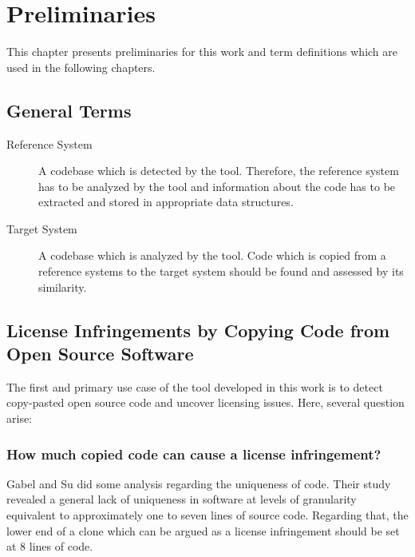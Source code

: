
\chapter{Preliminaries}\label{chapter:preliminaries}
This chapter presents preliminaries for this work and term definitions which are used in the following chapters.

\section{General Terms}
\begin{description}
	\item[Reference System]
		A codebase which is detected by the tool. 
		Therefore, the reference system has to be analyzed by the tool and information about the code has to be extracted and stored in appropriate data structures.
	\item[Target System]
		A codebase which is analyzed by the tool. 
		Code which is copied from a reference systems to the target system should be found and assessed by its similarity.
\end{description}

\section{License Infringements by Copying Code from Open Source Software}\label{section:preliminaries/infringement}
The first and primary use case of the tool developed in this work is to detect copy-pasted open source code and uncover licensing issues.
Here, several question arise:

\subsection*{How much copied code can cause a license infringement?}
Gabel and Su did some analysis regarding the uniqueness of code.
Their study \glqq revealed a general lack of uniqueness in software at levels of granularity equivalent to approximately one to seven lines of source code\grqq \cite{2010-gabel-su-source-code-uniqueness}.
Regarding that, the lower end of a clone which can be argued as a license infringement should be set at 8 lines of code.


